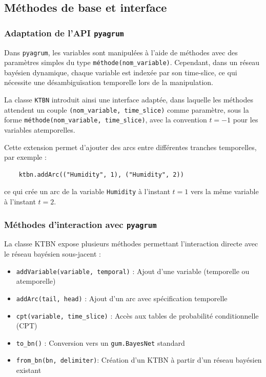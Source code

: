 \documentclass{article}
\begin{document}
\subsection{Méthodes de base et interface}

\subsubsection{Adaptation de l'API \texttt{pyagrum}}

Dans \texttt{pyagrum}, les variables sont manipulées à l'aide de méthodes avec des paramètres simples du type
\texttt{méthode(nom\_variable)}. Cependant, dans un réseau bayésien dynamique, chaque variable est indexée par son
time-slice, ce qui nécessite une désambiguïsation temporelle lors de la manipulation.

La classe \texttt{KTBN} introduit ainsi une interface adaptée, dans laquelle les méthodes attendent un couple
\texttt{(nom\_variable, time\_slice)} comme paramètre, sous la forme \texttt{méthode(nom\_variable, time\_slice)},
avec la convention $t=-1$ pour les variables atemporelles.

Cette extension permet d'ajouter des arcs entre différentes tranches temporelles, par exemple :

\begin{lstlisting}
    ktbn.addArc(("Humidity", 1), ("Humidity", 2))
\end{lstlisting}

ce qui crée un arc de la variable \texttt{Humidity} à l'instant $t = 1$ vers la même variable à l'instant $t = 2$.

\subsubsection{Méthodes d'interaction avec \texttt{pyagrum}}

La classe KTBN expose plusieurs méthodes permettant l'interaction directe avec le réseau bayésien sous-jacent :

\begin{itemize}
    \item \texttt{addVariable(variable, temporal)} : Ajout d'une variable (temporelle ou atemporelle)
    \item \texttt{addArc(tail, head)} : Ajout d'un arc avec spécification temporelle
    \item \texttt{cpt(variable, time\_slice)} : Accès aux tables de probabilité conditionnelle (CPT)
    \item \texttt{to\_bn()} : Conversion vers un \texttt{gum.BayesNet} standard
    \item \texttt{from\_bn(bn, delimiter)}: Création d'un KTBN à partir d'un réseau bayésien existant
\end{itemize}
\end{document}
